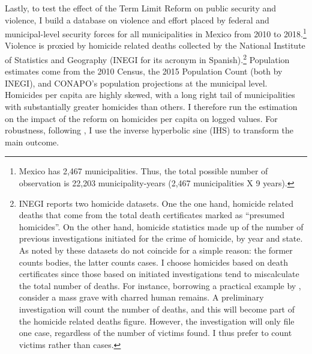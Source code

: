Lastly, to test the effect of the Term Limit Reform on public security and violence, I build a database on violence and effort placed by federal and municipal-level security forces for all municipalities in Mexico from 2010 to 2018.\footnote{Mexico has 2,467 municipalities. Thus, the total possible number of observation is 22,203 municipality-years (2,467 municipalities X 9 years).} Violence is proxied by homicide related deaths collected by the National Institute of Statistics and Geography (INEGI for its acronym in Spanish).\footnote{INEGI reports two homicide datasets. One the one hand, homicide related deaths that come from the total death certificates marked as ``presumed homicides''. On the other hand, homicide statistics made up of the number of previous investigations initiated for the crime of homicide, by year and state. As noted by \citet{rivera_2012} these datasets do not coincide for a simple reason: the former counts bodies, the latter counts cases. I choose homicides based on death certificates since those based on initiated investigations tend to miscalculate the total number of deaths. For instance, borrowing a practical example by \citet{rivera_2012}, consider a mass grave with charred human remains. A preliminary investigation will count the number of deaths, and this will become part of the homicide related deaths figure. However, the investigation will only file one case, regardless of the number of victims found. I thus prefer to count victims rather than cases.} Population estimates come from the 2010 Census, the 2015 Population Count (both by INEGI), and CONAPO's population projections at the municipal level. Homicides per capita are highly skewed, with a long right tail of municipalities with substantially greater homicides than others. I therefore run the estimation on the impact of the reform on homicides per capita on logged values. For robustness, following \citet{mackinnon_maggie_1990}, I use the inverse hyperbolic sine (IHS) to transform the main outcome. %


